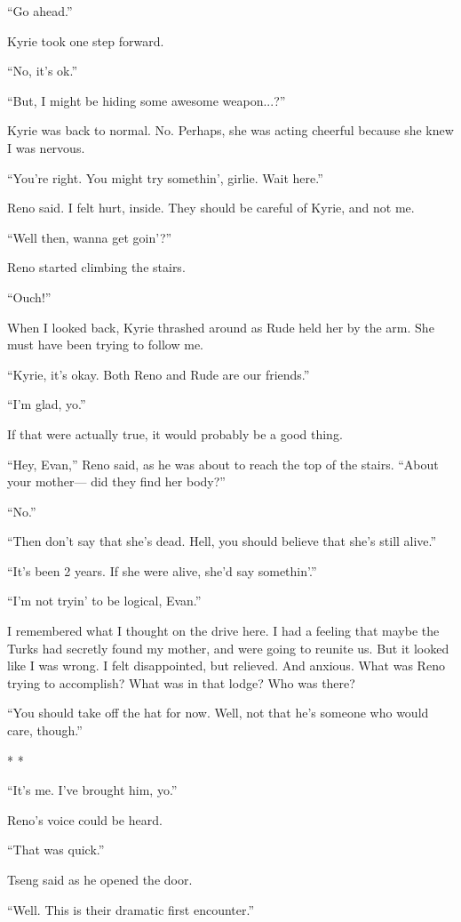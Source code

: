 \documentclass[oneside]{book}
\begin{document}
“Go ahead.”

Kyrie took one step forward.

“No, it’s ok.”

“But, I might be hiding some awesome weapon...?”

Kyrie was back to normal. No. Perhaps, she was acting cheerful because she knew I was nervous.

“You’re right. You might try somethin’, girlie. Wait here.”

Reno said. I felt hurt, inside. They should be careful of Kyrie, and not me.

“Well then, wanna get goin’?”

Reno started climbing the stairs.

“Ouch!”

When I looked back, Kyrie thrashed around as Rude held her by the arm. She must have been trying to follow me.

“Kyrie, it’s okay. Both Reno and Rude are our friends.”

“I’m glad, yo.”

If that were actually true, it would probably be a good thing.

“Hey, Evan,” Reno said, as he was about to reach the top of the stairs. “About your mother— did they find her body?”

“No.”

“Then don’t say that she’s dead. Hell, you should believe that she’s still alive.”

“It’s been 2 years. If she were alive, she’d say somethin’.”

“I’m not tryin’ to be logical, Evan.”

I remembered what I thought on the drive here. I had a feeling that maybe the Turks had secretly found my mother, and were going to reunite us. But it looked like I was wrong. I felt disappointed, but relieved. And anxious. What was Reno trying to accomplish? What was in that lodge? Who was there?

“You should take off the hat for now. Well, not that he’s someone who would care, though.”

* *

“It’s me. I’ve brought him, yo.”

Reno’s voice could be heard.

“That was quick.”

Tseng said as he opened the door.

“Well. This is their dramatic first encounter.”
\end{document}
